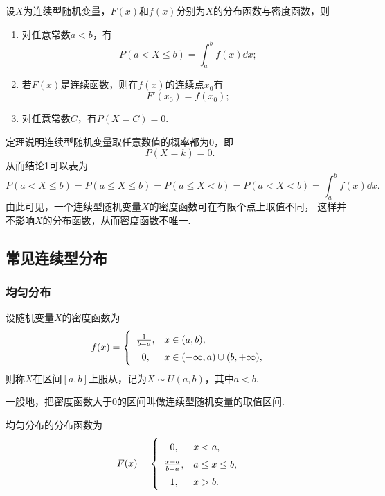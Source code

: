\begin{theorem}
设\(X\)为连续型随机变量，\(F(x)\)和\(f(x)\)分别为\(X\)的分布函数与密度函数，则
\begin{enumerate}
\item 对任意常数\(a < b\)，有\[
P(a < X \leq b) = \int_a^b{f(x) \dd{x}};
\]
\item 若\(F(x)\)是连续函数，则在\(f(x)\)的连续点\(x_0\)有\[
F'(x_0) = f(x_0);
\]
\item 对任意常数\(C\)，有\(P(X=C) = 0\).
\end{enumerate}
\end{theorem}

定理说明连续型随机变量取任意数值的概率都为0，即\[
P(X=k) = 0.
\]从而结论1可以表为\[
P(a < X \leq b)
= P(a \leq X \leq b)
= P(a \leq X < b)
= P(a < X < b)
= \int_a^b{f(x) \dd{x}}.
\]
由此可见，一个连续型随机变量\(X\)的密度函数可在有限个点上取值不同，
这样并不影响\(X\)的分布函数，从而密度函数不唯一.

\subsection{常见连续型分布}

\subsubsection{均匀分布}
\begin{definition}
设随机变量\(X\)的密度函数为\begin{equation}
f(x) = \left\{ \def\arraystretch{1.5}
\begin{array}{cl}
\frac{1}{b-a}, & x \in (a,b), \\
0, & x \in (-\infty,a) \cup (b,+\infty), \\
\end{array} \right.
\end{equation}则称\(X\)在区间\([a,b]\)上服从，记为\(X \sim U(a,b)\)，其中\(a < b\).

一般地，把密度函数大于0的区间叫做连续型随机变量的取值区间.
\end{definition}

\begin{theorem}
均匀分布的分布函数为\begin{equation}
F(x) = \left\{ \def\arraystretch{1.5}
\begin{array}{cl}
0, & x < a, \\
\frac{x-a}{b-a}, & a \leq x \leq b, \\
1, & x > b. \\
\end{array} \right.
\end{equation}
\end{theorem}

